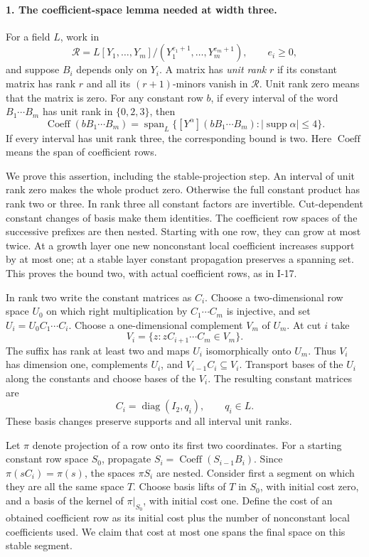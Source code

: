 \documentclass[11pt,a4paper]{article}
\theoremstyle{definition}\newtheorem{definition}{Definition}
\begin{document}
\paragraph{1. The coefficient-space lemma needed at width three.}
For a field $L$, work in
\[
 \mathcal R=L[Y_1,\ldots,Y_m]/(Y_1^{e_1+1},\ldots,Y_m^{e_m+1}),
 \qquad e_i\ge0,
\]
and suppose $B_i$ depends only on $Y_i$.  A matrix has \emph{unit rank}
$r$ if its constant matrix has rank $r$ and all its $(r+1)$-minors
vanish in $\mathcal R$.  Unit rank zero means that the matrix is zero.
For any constant row $b$, if every interval of the word
$B_1\cdots B_m$ has unit rank in $\{0,2,3\}$, then
\[
 \operatorname{Coeff}(bB_1\cdots B_m)
   =\operatorname{span}_L
       \{[Y^\alpha](bB_1\cdots B_m):
                         |\operatorname{supp}\alpha|\le4\}.
 \tag{I.24}\label{eq:I-profile23}
\]
If every interval has unit rank three, the corresponding bound is two.
Here $\operatorname{Coeff}$ means the span of coefficient rows.

We prove this assertion, including the stable-projection step.
An interval of unit rank zero makes the whole product zero.  Otherwise
the full constant product has rank two or three.  In rank three all
constant factors are invertible.  Cut-dependent constant changes of
basis make them identities.  The coefficient row spaces of the
successive prefixes are then nested.  Starting with one row, they can
grow at most twice.  At a growth layer one new nonconstant local
coefficient increases support by at most one; at a stable layer
constant propagation preserves a spanning set.  This proves the
bound two, with actual coefficient rows, as in I-17.

In rank two write the constant matrices as $C_i$.  Choose a
two-dimensional row space $U_0$ on which right multiplication by
$C_1\cdots C_m$ is injective, and set $U_i=U_0C_1\cdots C_i$.
Choose a one-dimensional complement $V_m$ of $U_m$.  At cut $i$ take
\[
 V_i=\{z:zC_{i+1}\cdots C_m\in V_m\}.
\]
The suffix has rank at least two and maps $U_i$ isomorphically onto
$U_m$.  Thus $V_i$ has dimension one, complements $U_i$, and
$V_{i-1}C_i\subseteq V_i$.  Transport bases of the $U_i$ along the
constants and choose bases of the $V_i$.  The resulting constant
matrices are
\[
 C_i=\operatorname{diag}(I_2,q_i),\qquad q_i\in L.
 \tag{I.25}
\]
These basis changes preserve supports and all interval unit ranks.

Let $\pi$ denote projection of a row onto its first two coordinates.
For a starting constant row space $S_0$, propagate
$S_i=\operatorname{Coeff}(S_{i-1}B_i)$.  Since
$\pi(sC_i)=\pi(s)$, the spaces $\pi S_i$ are nested.
Consider first a segment on which they are all the same space $T$.
Choose basis lifts of $T$ in $S_0$, with initial cost zero, and a basis
of the kernel of $\pi|_{S_0}$, with initial cost one.  Define the cost
of an obtained coefficient row as its initial cost plus the number
of nonconstant local coefficients used.  We claim that cost at most
one spans the final space on this stable segment.
\end{document}
